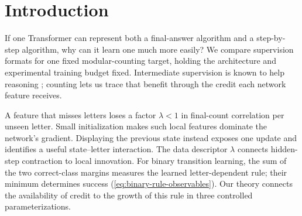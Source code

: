 \begin{abstract}
A Transformer can represent a counting algorithm yet struggle to learn it from final answers.
We explain how running-count supervision changes the gradient signal. Each unseen letter contracts
a feature's correlation with the final count, while small initialization favors features that read
few letters. In a two-block Transformer containing exact solutions for both formats, outcome
cross-entropy gradient flow from a zero readout therefore stays near chance for exponential time.
Displayed states expose a local innovation: rule credit is generically nonzero and has a quantitative
Gaussian lower bound under a quantitative geometric initialization event. Structured joint gradient
flow learns transitions in polynomial time, suppresses clean distractors, and, in a separate tied
feature model, learns the current-letter relative offset. The positive results retain specified
feature roles and training metrics. Experiments support the mechanism beyond these assumptions,
including LoRA-tuned object tracking, but a five-object reversal shows its empirical limits.
\end{abstract}

\section{Introduction}
\label{sec:intro}

If one Transformer can represent both a final-answer algorithm and a step-by-step algorithm,
why can it learn one much more easily? We compare supervision formats for one fixed modular-counting
target, holding the architecture and experimental training budget fixed. Intermediate supervision
is known to help reasoning \citep{nye2021scratchpads,wei2022cot,lightman2023verify}; counting lets us
trace that benefit through the credit each network feature receives.

A feature that misses letters loses a factor $\lambda<1$ in final-count correlation per unseen letter.
Small initialization makes such local features dominate the network's gradient. Displaying the
previous state instead exposes one update and identifies a useful state--letter interaction.
The data descriptor $\lambda$ connects hidden-step contraction to local innovation.
For binary transition learning, the sum of the two correct-class margins measures
the learned letter-dependent rule; their minimum determines success
(\cref{eq:binary-rule-observables}). Our theory connects the availability of credit
to the growth of this rule in three controlled parameterizations.

